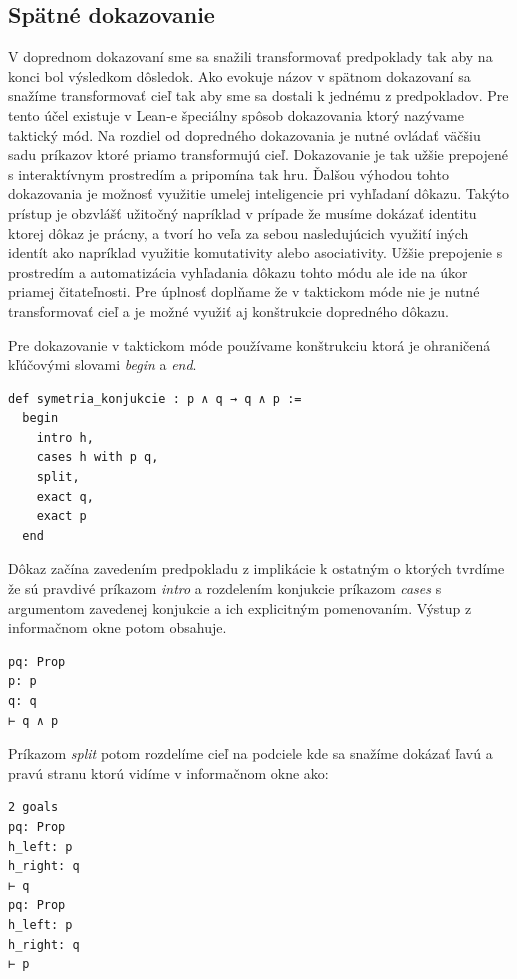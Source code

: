 \documentclass[a4paper,10pt,oneside]{report}%
\begin{document}
\subsection{Spätné dokazovanie}

    V doprednom dokazovaní sme sa snažili transformovať predpoklady tak aby na konci
bol výsledkom dôsledok.
    Ako evokuje názov v spätnom dokazovaní sa snažíme transformovať cieľ tak aby sme
sa dostali k jednému z predpokladov.
    Pre tento účel existuje v Lean-e špeciálny spôsob dokazovania ktorý nazývame taktický
mód.
    Na rozdiel od dopredného dokazovania je nutné ovládať väčšiu sadu príkazov ktoré
priamo transformujú cieľ.
    Dokazovanie je tak užšie prepojené s interaktívnym prostredím a pripomína tak hru.
    Ďalšou výhodou tohto dokazovania je možnosť využitie umelej inteligencie pri vyhľadaní
dôkazu.
    Takýto prístup je obzvlášť užitočný napríklad v prípade že musíme dokázať identitu
ktorej dôkaz je prácny, a tvorí ho veľa za sebou nasledujúcich využití iných
identít ako napríklad využitie komutativity alebo asociativity.
    Užšie prepojenie s prostredím a automatizácia vyhľadania dôkazu tohto módu ale
ide na úkor priamej čitateľnosti.
    Pre úplnosť doplňame že v taktickom móde nie je nutné transformovať cieľ a je možné
využiť aj konštrukcie dopredného dôkazu.

    Pre dokazovanie v taktickom móde používame konštrukciu ktorá je ohraničená
kľúčovými slovami \emph{begin} a \emph{end}.

\begin{lstlisting}
def symetria_konjukcie : p ∧ q → q ∧ p :=
  begin
    intro h,
    cases h with p q,
    split,
    exact q,
    exact p
  end
\end{lstlisting}

Dôkaz začína zavedením predpokladu z implikácie k ostatným o ktorých tvrdíme že
    sú pravdivé príkazom \emph{intro} a rozdelením konjukcie príkazom \emph{cases}
    s argumentom zavedenej konjukcie a ich explicitným pomenovaním.
Výstup z informačnom okne potom obsahuje.

\begin{lstlisting}
pq: Prop
p: p
q: q
⊢ q ∧ p
\end{lstlisting}

Príkazom \emph{split} potom rozdelíme cieľ na podciele kde sa snažíme dokázať
ľavú a pravú stranu ktorú vidíme v informačnom okne ako:

\begin{lstlisting}
2 goals
pq: Prop
h_left: p
h_right: q
⊢ q
pq: Prop
h_left: p
h_right: q
⊢ p
\end{lstlisting}
\end{document}
